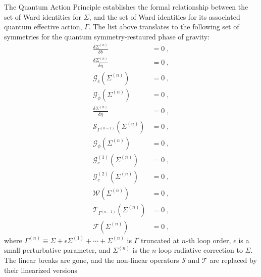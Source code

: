 \documentclass[../main.tex]{subfiles}
\begin{document}
The Quantum Action Principle establishes the formal relationship between the set of Ward identities for $ \Sigma $, and the set of Ward identities for its associated quantum effective action, $ \Gamma $. The list above translates to the following set of symmetries for the quantum symmetry-restaured phase of gravity:
\begin{subequations}%
  \label{eq:ward-identities}
  \begin{align}
    \frac{ \delta \Sigma^{ \left( n \right) } }{ \delta b }            & = 0 \;,                                \\
    \frac{ \delta \Sigma^{ \left( n \right) } }{ \delta \bar{ \eta } } & = 0 \;,                                \\
    \mathcal{G}_{ \bar{ c } } \left( \Sigma ^{ (n) } \right)           & = 0 \;,                                \\
    \mathcal{G}_{ \bar{ \phi  } } \left( \Sigma ^{ (n) } \right)       & = 0 \;,                                \\
    \frac{ \delta \Sigma^{ \left( n \right) } }{ \delta \bar{ \eta } } & = 0 \;,                                \\
    \mathcal{S}_{\Gamma^{(n-1)}} \left( \Sigma^{ (n)} \right)          & = 0 \;, \label{eq:quantum-st-identity} \\
    \mathcal{G}_{ \phi } \left( \Sigma ^{ (n) } \right)                & = 0 \;,                                \\
    \mathcal{G}^{(1)}_{ c } \left( \Sigma ^{ (n) } \right)             & = 0 \;,                                \\
    \mathcal{G}^{(2)}_{ c } \left( \Sigma ^{ (n) } \right)             & = 0 \;,                                \\
    \mathcal{W} \left( \Sigma^{ (n)} \right)                           & = 0 \;,                                \\
    \mathcal{T}_{\Gamma^{(n-1)}} \left( \Sigma^{ (n)} \right)          & = 0 \;,                                \\
    \mathcal{F} \left( \Sigma^{ (n)} \right)                           & = 0 \;,
  \end{align}
\end{subequations}
where $\Gamma^{(n)} \equiv \Sigma + \epsilon \Sigma^{(1)} + \cdots + \Sigma^{ (n) }$ is $ \Gamma  $ truncated at $ n $-th loop order, $ \epsilon $ is a small perturbative parameter, and $ \Sigma^{ (n)} $ is the $n$-loop radiative correction to $ \Sigma  $. The linear breaks are gone, and the non-linear operators $ \mathcal{S} $ and $ \mathcal{T} $ are replaced by their linearized versions
\end{document}
